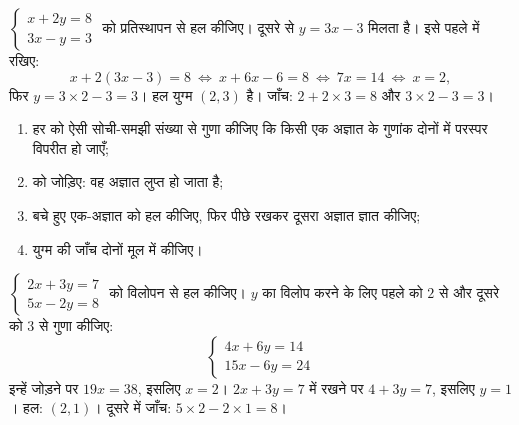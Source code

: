 \begin{example}\label{ex:g10:lines:substitution}
$\begin{cases} x + 2y = 8 \\ 3x - y = 3 \end{cases}$ को प्रतिस्थापन से हल कीजिए। दूसरे  से $y = 3x - 3$ मिलता है। इसे पहले में
रखिए:
\[
x + 2(3x - 3) = 8
\ \Longleftrightarrow\
x + 6x - 6 = 8
\ \Longleftrightarrow\
7x = 14
\ \Longleftrightarrow\
x = 2 ,
\]
फिर $y = 3 \times 2 - 3 = 3$। हल युग्म $(2, 3)$ है। जाँच: $2 + 2 \times 3 = 8$ और $3 \times 2 - 3 = 3$।
\end{example}

\begin{method}[विलोपन]\label{met:g10:lines:elimination}
\begin{enumerate}
  \item हर  को ऐसी सोची-समझी संख्या से गुणा कीजिए कि किसी एक अज्ञात
        के गुणांक दोनों  में परस्पर विपरीत हो जाएँ;
  \item {} को जोड़िए: वह अज्ञात लुप्त हो जाता है;
  \item बचे हुए एक-अज्ञात \omterm{def:g10:algebra:equation}{समीकरण} को हल कीजिए, फिर पीछे रखकर दूसरा अज्ञात
        ज्ञात कीजिए;
  \item युग्म की जाँच दोनों मूल \omterm{def:g10:algebra:equation}{समीकरणों} में कीजिए।
\end{enumerate}
\end{method}

\begin{example}\label{ex:g10:lines:elimination}
$\begin{cases} 2x + 3y = 7 \\ 5x - 2y = 8 \end{cases}$ को विलोपन से हल कीजिए। $y$ का विलोप करने के लिए पहले  को $2$
से और दूसरे को $3$ से गुणा कीजिए:
\[
\begin{cases}
4x + 6y = 14 \\
15x - 6y = 24
\end{cases}
\]
इन्हें जोड़ने पर $19x = 38$, इसलिए $x = 2$। $2x + 3y = 7$ में रखने पर $4 + 3y = 7$, इसलिए $y = 1$। हल:
$(2, 1)$। दूसरे  में जाँच: $5 \times 2 - 2 \times 1 = 8$।
\end{example}

